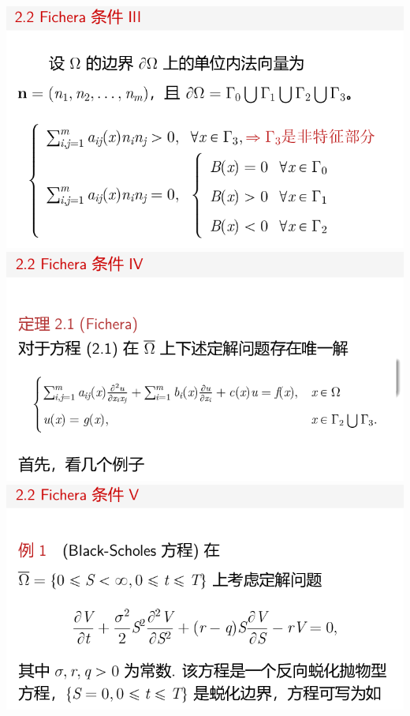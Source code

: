 \documentclass[11pt,a4paper]{ctexart}
\begin{document}
\begin{paracol}{2}
\includegraphics[width=\linewidth]{chap05_24.png}
\includegraphics[width=\linewidth]{chap05_25.png}
\includegraphics[width=\linewidth]{chap05_26.png}
\newpage


\end{paracol}
\end{document}
